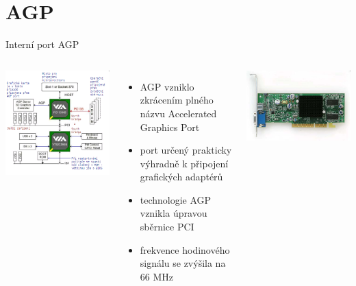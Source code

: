\documentclass[aspectratio=43]{beamer}
\begin{document}
\section{AGP}
\begin{frame}{Interní port AGP}
	\begin{columns}
		\includegraphics[width=1\linewidth]{extrahovane_obrazky/img_1_page18_0.png}
		\begin{itemize}
			\item AGP vzniklo zkrácením plného názvu Accelerated Graphics Port
			\item port určený prakticky výhradně k připojení grafických adaptérů
			\item technologie AGP vznikla úpravou sběrnice PCI
			\item frekvence hodinového signálu se zvýšila na 66 MHz
		\end{itemize}
        \begin{center}
            \includegraphics[width=0.8\linewidth]{extrahovane_obrazky/img_1_page18_15.jpeg}
        \end{center}
	\end{columns}
	
\end{frame}
\end{document}
